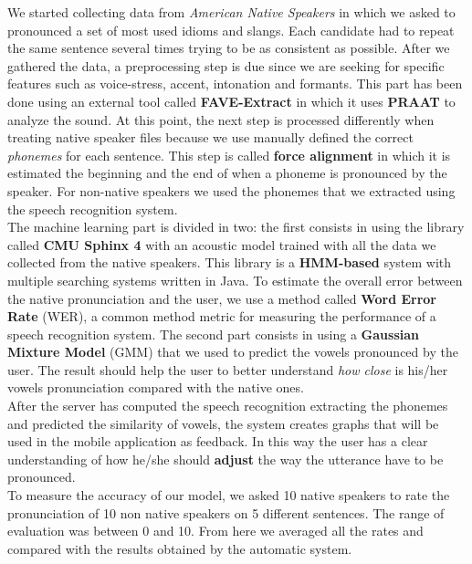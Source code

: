 \noindent We started collecting data from \textit{American Native Speakers} in which we asked to pronounced a set of most used idioms and slangs. Each candidate had to repeat the same sentence several times trying to be as consistent as possible. After we gathered the data, a preprocessing step is due since we are seeking for specific features such as voice-stress, accent, intonation and formants. 
This part has been done using an external tool called \textbf{FAVE-Extract} in which it uses \textbf{PRAAT}\cite{boersma2010p} to analyze the sound. At this point, the next step is processed differently when treating native speaker files because we use manually defined the correct \textit{phonemes} for each sentence. This step is called \textbf{force alignment} in which it is estimated the beginning and the end of when a phoneme is pronounced by the speaker. For non-native speakers we used the phonemes that we extracted using the speech recognition system. \\

\noindent The machine learning part is divided in two: the first consists in using the library called \textbf{CMU Sphinx 4} with an acoustic model trained with all the data we collected from the native speakers. This library is a \textbf{HMM-based} system with multiple searching systems written in Java. To estimate the overall error between the native pronunciation and the user, we use a method called \textbf{Word Error Rate} (WER), a common method metric for measuring the performance of a speech recognition system. 
The second part consists in using a \textbf{Gaussian Mixture Model} (GMM) that we used to predict the vowels pronounced by the user. The result should help the user to better understand \textit{how close} is his/her vowels pronunciation compared with the native ones. \\

\noindent After the server has computed the speech recognition extracting the phonemes and predicted the similarity of vowels, the system creates graphs that will be used in the mobile application as feedback. In this way the user has a clear understanding of how he/she should \textbf{adjust} the way the utterance have to be pronounced. \\

\noindent To measure the accuracy of our model, we asked 10 native speakers to rate the pronunciation of 10 non native speakers on 5 different sentences. The range of evaluation was between 0 and 10. From here we averaged all the rates and compared with the results obtained by the automatic system.
